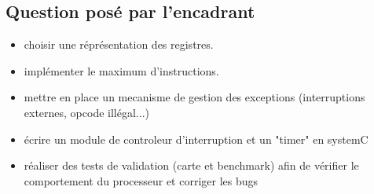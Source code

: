 \subsection{Question posé par l'encadrant}

\begin{itemize}
\item choisir une réprésentation des registres.
\item implémenter le maximum d'instructions.
\item mettre en place un mecanisme de gestion des exceptions (interruptions externes, opcode illégal...) 
\item écrire un module de controleur d'interruption et un "timer" en systemC
\item réaliser des tests de validation (carte et benchmark) afin de vérifier le comportement du processeur et corriger les bugs
\end{itemize}